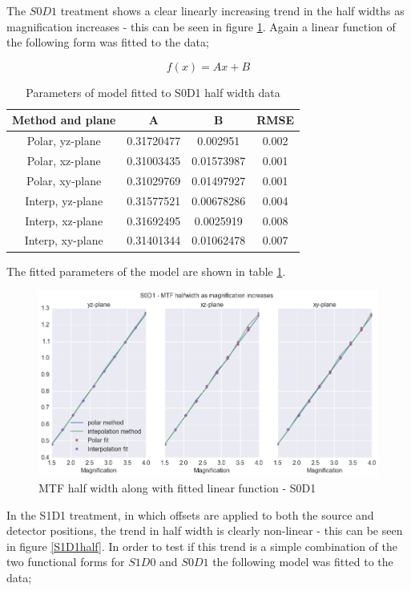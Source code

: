 \documentclass[
  twoside,
  11pt, a4paper,
  footinclude=true,
  headinclude=true,
  cleardoublepage=empty
]{scrbook}
\begin{document}
The $S0D1$ treatment shows a clear linearly increasing trend in the half widths as magnification increases - this can be seen in figure \ref{S0D1half}. Again a linear function of the following form was fitted to the data;

\[
f(x) = Ax + B
\]


\begin{table}
\caption{Parameters of model fitted to S0D1 half width data}
\label{linhalffit}
\begin{tabular}{c|ccc}
\toprule
{} Method and plane &     A &     B &  RMSE\\
\midrule
Polar, yz-plane         &  0.31720477 & 0.002951    & 0.002\\
Polar, xz-plane        &  0.31003435 & 0.01573987 &  0.001\\
Polar, xy-plane      &  0.31029769 & 0.01497927 &  0.001\\
Interp, yz-plane       &  0.31577521 & 0.00678286 &  0.004\\
Interp, xz-plane       &  0.31692495 & 0.0025919 &  0.008\\
Interp, xy-plane       &  0.31401344 & 0.01062478 &  0.007\\
\bottomrule
\end{tabular}
\end{table}

The fitted parameters of the model are shown in table \ref{linhalffit}.

\begin{figure}[h!]
  \centering
    \includegraphics[width=\textwidth]{code/MTF_and_PSF/MTF_Interp_Polar_Plots_files/MTF_Interp_Polar_Plots_7_0.png}
    \caption{MTF half width along with fitted linear function - S0D1}
        \label{S0D1half}
\end{figure}

In the S1D1 treatment, in which offsets are applied to both the source and detector positions, the trend in half width is clearly non-linear - this can be seen in figure \ref{S1D1half}. In order to test if this trend is a simple combination of the two functional forms for $S1D0$ and $S0D1$ the following model was fitted to the data;
\end{document}
